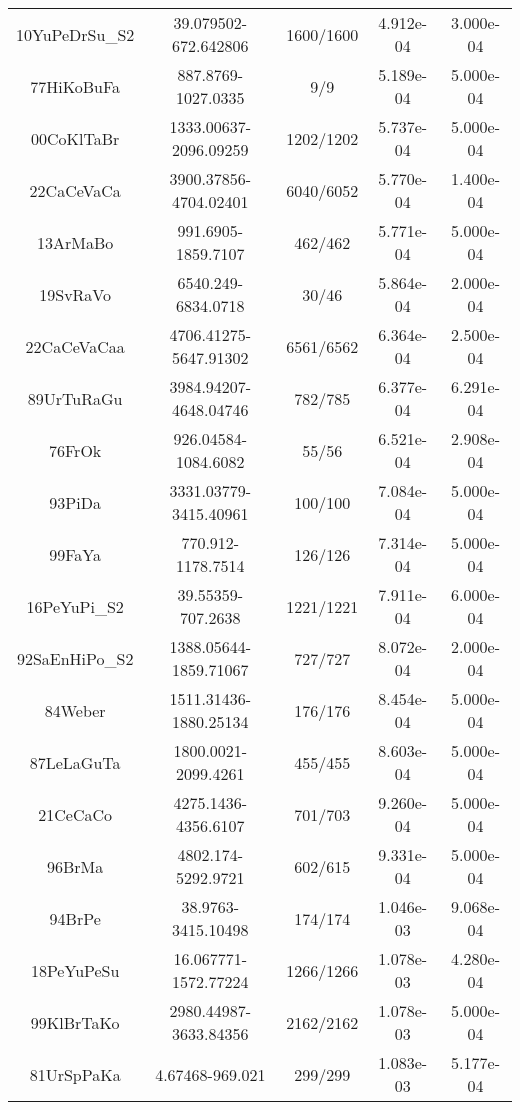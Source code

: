 \begin{longtable}{c c c c c}
10YuPeDrSu_S2 \cite{10YuPeDrSu_S2} & 39.079502-672.642806 & 1600/1600 & 4.912e-04 & 3.000e-04 \\
77HiKoBuFa \cite{77HiKoBuFa} & 887.8769-1027.0335 & 9/9 & 5.189e-04 & 5.000e-04 \\
00CoKlTaBr \cite{00CoKlTaBr} & 1333.00637-2096.09259 & 1202/1202 & 5.737e-04 & 5.000e-04 \\
22CaCeVaCa \cite{22CaCeVaCa} & 3900.37856-4704.02401 & 6040/6052 & 5.770e-04 & 1.400e-04 \\
13ArMaBo \cite{13ArMaBo} & 991.6905-1859.7107 & 462/462 & 5.771e-04 & 5.000e-04 \\
19SvRaVo \cite{19SvRaVo} & 6540.249-6834.0718 & 30/46 & 5.864e-04 & 2.000e-04 \\
22CaCeVaCaa \cite{22CaCeVaCaa} & 4706.41275-5647.91302 & 6561/6562 & 6.364e-04 & 2.500e-04 \\
89UrTuRaGu \cite{89UrTuRaGu} & 3984.94207-4648.04746 & 782/785 & 6.377e-04 & 6.291e-04 \\
76FrOk \cite{76FrOk} & 926.04584-1084.6082 & 55/56 & 6.521e-04 & 2.908e-04 \\
93PiDa \cite{93PiDa} & 3331.03779-3415.40961 & 100/100 & 7.084e-04 & 5.000e-04 \\
99FaYa \cite{99FaYa} & 770.912-1178.7514 & 126/126 & 7.314e-04 & 5.000e-04 \\
16PeYuPi_S2 \cite{16PeYuPi_S2} & 39.55359-707.2638 & 1221/1221 & 7.911e-04 & 6.000e-04 \\
92SaEnHiPo_S2 \cite{92SaEnHiPo_S2} & 1388.05644-1859.71067 & 727/727 & 8.072e-04 & 2.000e-04 \\
84Weber \cite{84Weber} & 1511.31436-1880.25134 & 176/176 & 8.454e-04 & 5.000e-04 \\
87LeLaGuTa \cite{87LeLaGuTa} & 1800.0021-2099.4261 & 455/455 & 8.603e-04 & 5.000e-04 \\
21CeCaCo \cite{21CeCaCo} & 4275.1436-4356.6107 & 701/703 & 9.260e-04 & 5.000e-04 \\
96BrMa \cite{96BrMa} & 4802.174-5292.9721 & 602/615 & 9.331e-04 & 5.000e-04 \\
94BrPe \cite{94BrPe} & 38.9763-3415.10498 & 174/174 & 1.046e-03 & 9.068e-04 \\
18PeYuPeSu \cite{18PeYuPeSu} & 16.067771-1572.77224 & 1266/1266 & 1.078e-03 & 4.280e-04 \\
99KlBrTaKo \cite{99KlBrTaKo} & 2980.44987-3633.84356 & 2162/2162 & 1.078e-03 & 5.000e-04 \\
81UrSpPaKa \cite{81UrSpPaKa} & 4.67468-969.021 & 299/299 & 1.083e-03 & 5.177e-04 \\

\end{longtable}
